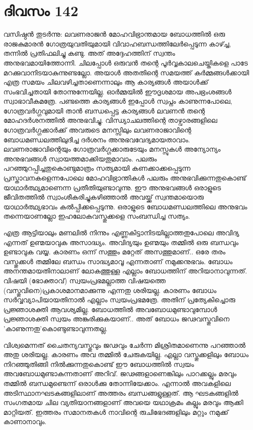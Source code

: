 
\section{ദിവസം 142}


വസിഷ്ഠൻ തുടർന്നു: ലവണരാജൻ മോഹവിഭ്രാന്തമായ ബോധത്തിൽ ഒരു രാജകുമാരൻ ഗോത്രയുവതിയുമായി വിവാഹബന്ധത്തിലേർപ്പെടുന്ന കാഴ്ച്ച, തന്നിൽ പ്രതിഫലിച്ചു കണ്ടു. അത് അദ്ദേഹത്തിന്‌ സ്വന്തം അനുഭവമായിത്തോന്നി. ചിലപ്പോൾ ഒരുവൻ തന്റെ പൂർവ്വകാലചെയ്തികളെ പാടേ മറക്കുവാനിടയാകുന്നുണ്ടല്ലോ. അയാൾ അതതിന്റെ സമയത്ത് കർമ്മങ്ങൾക്കായി എത്ര സമയം ചിലവഴിച്ചതാണെന്നാലും ആ കാര്യങ്ങൾ അയാൾക്ക് സംഭവിച്ചതായി തോന്നുന്നേയില്ല. ഓർമ്മയിൽ ഈദൃശമായ അപഭ്രംശങ്ങൾ സ്വാഭാവീകമത്രേ. പണ്ടത്തെ കാര്യങ്ങൾ ഇപ്പോൾ സ്വപ്നം കാണുന്നപോലെ, ഗോത്രവർഗ്ഗവുമായി താൻ ബന്ധപ്പെട്ട കാര്യങ്ങൾ ലവണൻ തന്റെ മോഹദർശനത്തിൽ അനുഭവിച്ചു. വിന്ധ്യാചലത്തിന്റെ താഴ്വാരങ്ങളിലെ ഗോത്രവർഗ്ഗക്കാർക്ക് അവരുടെ മനസ്സിലും ലവണരാജാവിന്റെ ബോധമണ്ഡലത്തിലുദിച്ച ദർശനം അനുഭവവേദ്യമായതാവാം. ലവണരാജാവിന്റെയും ഗോത്രവർഗ്ഗക്കാരുടേയും മനസ്സുകൾ അന്യോന്യം അനുഭവങ്ങൾ സ്വായത്തമാക്കിയതുമാവാം. പലരും പറഞ്ഞുറപ്പിച്ചതുകൊണ്ടുമാത്രം സത്യമായി കണക്കാക്കപ്പെടുന്ന പ്രസ്താവനകളെന്നപോലെ മോഹവിഭ്രാന്തികൾ പലരും അനുഭവിക്കുന്നതുകൊണ്ട് യാഥാർത്ഥ്യമാണെന്ന പ്രതീതിയുണ്ടാവുന്നു. ഈ അനുഭവങ്ങൾ ഒരാളുടെ ജീവിതത്തിൽ സ്വാംശീകരിച്ചുകഴിഞ്ഞാൽ അവയ്ക്ക് സ്വന്തമായൊരു യാഥാർത്ഥ്യഭാവം കൽപ്പിക്കപ്പെടുന്നു. ഒരാളുടെ ബോധമണ്ഡലത്തിലെ അനുഭവം തന്നെയാണല്ലോ ഇഹലോകവസ്തുക്കളെ സംബന്ധിച്ച സത്യം.

എത്ര ആട്ടിയാലും മണലിൽ നിന്നും എണ്ണകിട്ടാനിടയില്ലാത്തതുപോലെ അവിദ്യ എന്നത് ഉണ്മയാവുക അസാദ്ധ്യം. അവിദ്യയും ഉണ്മയും തമ്മിൽ ഒരു ബന്ധവും ഉണ്ടാവുക വയ്യ. കാരണം ഒന്ന് സത്തും മറ്റേത് അസത്തുമാണ്‌.. ഒരേ തരം വസ്തുക്കൾ തമ്മിലേ ബന്ധം സാദ്ധ്യമാവൂ എന്നതാണ്‌ നമുക്കനുഭവം. ബോധം അനന്തമായതിനാലാണ്‌ ലോകത്തുള്ള എല്ലാം ബോധത്തിന്‌ അറിയാനാവുന്നത്. വിഷയി (ഭോക്താവ്) സ്വയംപ്രഭമല്ലാത്ത വിഷയത്തെ (വസ്തുവിനെ)പ്രകാശമാനമാക്കുന്നു എന്നതു ശരിയല്ല. കാരണം ബോധം സർവ്വവ്യാപിയായതിനാൽ എല്ലാം സ്വയംപ്രഭമത്രേ. അതിന്‌ പ്രത്യേകിച്ചൊരു പ്രജ്ഞാശക്തി ആവശ്യമില്ല. ബോധത്തിൽ അവബോധമുണ്ടാവുമ്പോൾ പ്രജ്ഞാശക്തി സ്വയം അങ്കുരിക്കുകയാണ്‌.. അത് ബോധം ജഢവസ്തുവിനെ 'കാണുന്നതു'കൊണ്ടുണ്ടാവുന്നതല്ല.

വിശ്വമെന്നത് ചൈതന്യവസ്തുവും ജഢവും ചേർന്ന മിശ്രിതമാണെന്നു പറഞ്ഞാൽ അതു ശരിയല്ല. കാരണം അവ തമ്മിൽ ചേരുകയില്ല. എല്ലാ വസ്തുക്കളിലും ബോധം നിറഞ്ഞുതിങ്ങി നിൽക്കുന്നതുകൊണ്ട് ഈ ബോധത്തിൽ സ്വയം അവബോധമുണ്ടാകുന്നതാണ്‌ അറിവ്. ജഢങ്ങളാണെങ്കിലും പാറക്കല്ലും മരവും തമ്മിൽ ബന്ധമുണ്ടെന്ന് ഒരാൾക്കു തോന്നിയേക്കാം. എന്നാൽ അവകളിലെ അടിസ്ഥാനഘടകങ്ങളിലാണ്‌ അത്തരം ബന്ധങ്ങളുള്ളത്. ആ ഘടകങ്ങളിൽ സംഗതമായ ചില വ്യതിയാനങ്ങളാണ്‌ അവയെ യഥാക്രമം കല്ലും മരവും ആക്കി മാറ്റിയത്. ഇത്തരം സമാനതകൾ നാവിന്റെ രുചിഭേദങ്ങളിലും മറ്റും നമുക്ക് കാണാനാവും. 

